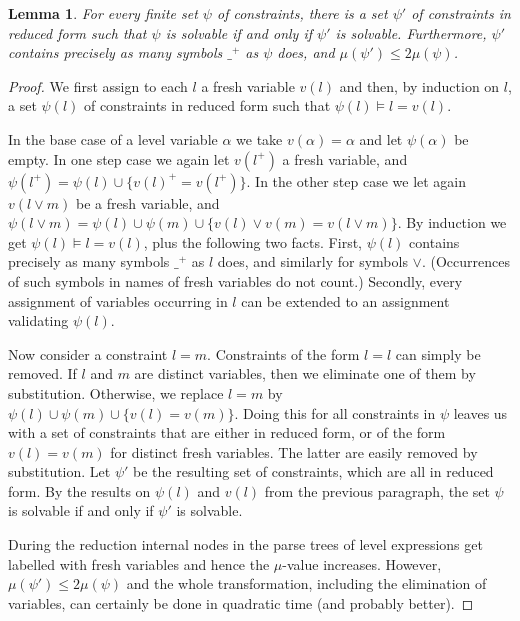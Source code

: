 \documentclass[11pt,a4paper]{article}
\newtheorem{lemma}{Lemma}[theorem]
\newcommand{\set}[1]{\{#1\}}
\begin{document}
\begin{lemma}\label{lem:reduced-form}
For every finite set  $\psi$ of constraints, there is a set  $\psi'$ of
constraints in reduced form such that  $\psi$ is solvable if and only if  $\psi'$
is solvable. Furthermore,  $\psi'$ contains precisely as many symbols $\_^+$ as  $\psi$ does,
and $\mu(\psi')\leq 2\mu(\psi)$.
\end{lemma}

\begin{proof}
We first assign to each $l$ a fresh variable $v(l)$ and then, by induction on $l$,
a set $ \psi(l)$ of constraints in reduced form such that $ \psi(l)\models l = v(l)$.

In the base case of a level variable $\alpha$ we take $v(\alpha)=\alpha$ and let $ \psi(\alpha)$ be empty. In one step case we again let $v(l^+)$ a fresh variable,
and $ \psi(l^+) =  \psi(l) \cup \set{v(l)^+ =v(l^+)}$.
In the other step case we let again $v(l\vee m)$ be a fresh variable,
and $ \psi(l\vee m) =  \psi(l) \cup  \psi(m) \cup \set{v(l)\vee v(m) =v(l\vee m)}$.
By induction we get $ \psi(l)\models l = v(l)$, plus the following two facts.
First, $ \psi(l)$ contains precisely as many symbols $\_^+$ as $l$ does,
and similarly for symbols $\vee$.
(Occurrences of such symbols in names of fresh variables do not count.)
Secondly, every assignment of variables occurring in $l$ can be extended to an
assignment validating $\psi(l)$.

Now consider a constraint $l=m$. Constraints of the form $l=l$ can
simply be removed. If $l$ and $m$ are distinct variables,
then we eliminate one of them by substitution. Otherwise,
we replace $l=m$ by $ \psi(l)\cup  \psi(m)\cup \set{v(l)=v(m)}$.
Doing this for all constraints in  $\psi$
leaves us with a set of constraints that are either in
reduced form, or of the form $v(l)=v(m)$ for distinct fresh variables.
The latter are easily removed by substitution. Let  $\psi'$ be the resulting set
of constraints, which are all in reduced form. By the results on $ \psi(l)$
and $v(l)$ from the previous paragraph, the set  $\psi$ is solvable if
and only if  $\psi'$ is solvable.

During the reduction internal nodes in the parse trees of level expressions get labelled with fresh variables and hence the $\mu$-value increases. However,  $\mu(\psi')\leq 2\mu(\psi)$ and the whole transformation, including the
elimination of variables, can certainly be done in quadratic time
(and probably better).
\end{proof}
\end{document}
